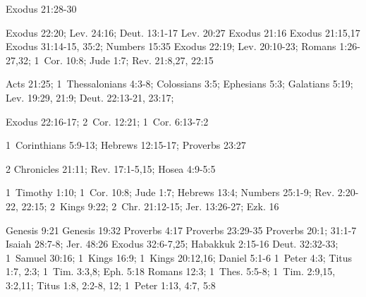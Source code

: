 {\begin{multicols*}{3}
{ 
    Exodus 21:28-30
    
    Exodus 22:20;
    Lev. 24:16;
    Deut. 13:1-17
    Lev. 20:27
    Exodus 21:16
    Exodus 21:15,17
    Exodus 31:14-15, 35:2;
    Numbers 15:35
    Exodus 22:19;
    Lev. 20:10-23;
    Romans 1:26-27,32; 
    1~Cor. 10:8;
    Jude 1:7;
    Rev. 21:8,27, 22:15

{}
    Acts 21:25;
    1~Thessalonians 4:3-8;
    Colossians 3:5;
    Ephesians 5:3;
    Galatians 5:19;
    Lev. 19:29, 21:9;
    Deut. 22:13-21, 23:17;
    
 Exodus 22:16-17;
    2~Cor. 12:21;
    1~Cor. 6:13-7:2
   
    1~Corinthians 5:9-13;
    Hebrews 12:15-17;
    Proverbs 23:27
    
    2 Chronicles 21:11;
    Rev. 17:1-5,15;
    Hosea 4:9-5:5
    
    1~Timothy 1:10;
    1~Cor. 10:8;
    Jude 1:7;
    Hebrews 13:4;
    Numbers 25:1-9;
    Rev. 2:20-22, 22:15;
    2~Kings 9:22;
    2~Chr. 21:12-15;
    Jer. 13:26-27;
    Ezk. 16
    
 Genesis 9:21
 Genesis 19:32
 Proverbs 4:17
 Proverbs 23:29-35
 Proverbs 20:1; 31:1-7
 Isaiah 28:7-8; Jer. 48:26
 Exodus 32:6-7,25; Habakkuk 2:15-16
 Deut. 32:32-33; 1~Samuel 30:16; 1~Kings 16:9; 1~Kings 20:12,16; Daniel 5:1-6
 1~Peter 4:3; Titus 1:7, 2:3; 1~Tim. 3:3,8; Eph. 5:18
 Romans 12:3; 1~Thes. 5:5-8; 1~Tim. 2:9,15, 3:2,11; Titus 1:8, 2:2-8, 12; 1~Peter 1:13, 4:7, 5:8



}\end{multicols*}
\setlength{\parindent}{1em}
}



